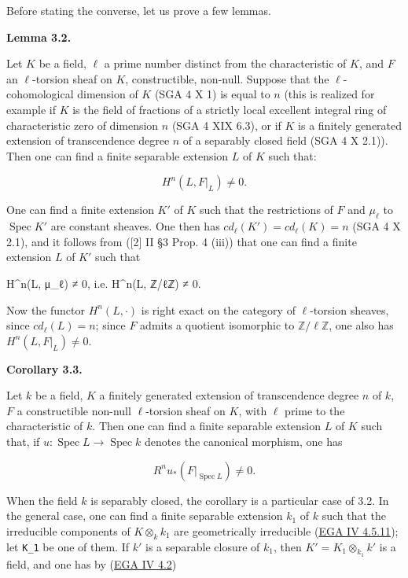 \documentclass[
  11pt,
  a4paper,
]{book}
\newenvironment{Shaded}{}{}
\newcommand{\NormalTok}[1]{#1}
\begin{document}
Before stating the converse, let us prove a few lemmas.

\textbf{Lemma 3.2.}

Let \(K\) be a field, \(\ell\) a prime number distinct from the
characteristic of \(K\), and \(F\) an \(\ell\)-torsion sheaf on \(K\),
constructible, non-null. Suppose that the \(\ell\)-cohomological
dimension of \(K\) (SGA 4 X 1) is equal to \(n\) (this is realized for
example if \(K\) is the field of fractions of a strictly local excellent
integral ring of characteristic zero of dimension \(n\) (SGA 4 XIX 6.3),
or if \(K\) is a finitely generated extension of transcendence degree
\(n\) of a separably closed field (SGA 4 X 2.1)). Then one can find a
finite separable extension \(L\) of \(K\) such that:

\[ H^{n}(L, F|_{L}) \neq 0. \]

One can find a finite extension \(K'\) of \(K\) such that the
restrictions of \(F\) and \(\mu_{\ell}\) to \(\operatorname{Spec}
K'\) are constant sheaves. One then has
\(cd_{\ell}(K') = cd_{\ell}(K) = n\) (SGA 4 X 2.1), and it follows from
({[}2{]} II §3 Prop. 4 (iii)) that one can find a finite extension \(L\)
of \(K'\) such that

\begin{Shaded}
\begin{Highlighting}[]
\NormalTok{H\^{}n(L, μ\_ℓ) ≠ 0, i.e. H\^{}n(L, ℤ/ℓℤ) ≠ 0.}
\end{Highlighting}
\end{Shaded}

Now the functor \(H^{n}(L, \cdot)\) is right exact on the category of
\(\ell\)-torsion sheaves, since \(cd_{\ell}(L) = n\); since \(F\) admits
a quotient isomorphic to \(\mathbb{Z}/\ell \mathbb{Z}\), one also has
\(H^{n}(L, F|_{L}) \neq 0\).

\textbf{Corollary 3.3.}

Let \(k\) be a field, \(K\) a finitely generated extension of
transcendence degree \(n\) of \(k\), \(F\) a constructible non-null
\(\ell\)-torsion sheaf on \(K\), with \(\ell\) prime to the
characteristic of \(k\). Then one can find a finite separable extension
\(L\) of \(K\) such that, if
\(u : \operatorname{Spec} L \to \operatorname{Spec} k\) denotes the
canonical morphism, one has

\[ R^{n} u_{*}(F|_{\operatorname{Spec} L}) \neq 0. \]

When the field \(k\) is separably closed, the corollary is a particular
case of 3.2. In the general case, one can find a finite separable
extension \(k_{1}\) of \(k\) such that the irreducible components of
\(K \otimes_{k} k_{1}\) are geometrically irreducible
(\href{https://jcreinhold.github.io/ega/iv/16-ch4-04-base-field-change.html\#45-geometrically-irreducible-and-geometrically-connected-preschemes}{EGA
IV 4.5.11}); let \texttt{K\_1} be one of them. If \(k'\) is a separable
closure of \(k_{1}\), then \(K'
= K_{1} \otimes_{k_{1}} k'\) is a field, and one has by
(\href{https://jcreinhold.github.io/ega/iv/16-ch4-04-base-field-change.html\#42-associated-prime-cycles-on-algebraic-preschemes}{EGA
IV 4.2})
\end{document}
